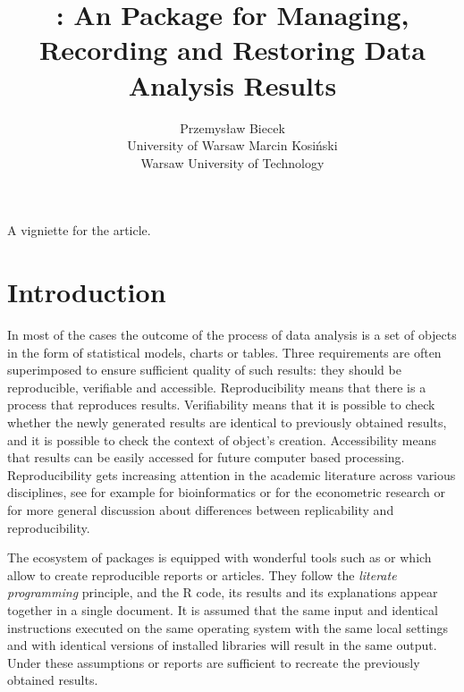 \documentclass[nojss]{jss}\usepackage[]{graphicx}\usepackage[]{color}
\author{Przemys\l{}aw Biecek\\University of Warsaw \And 
        Marcin Kosi\'nski\\Warsaw University of Technology}
\title{\pkg{archivist}: An \proglang{R} Package for Managing, Recording and Restoring Data Analysis Results}
\begin{document}
A vigniette for the \cite{archivist} article.


\section{Introduction}

In most of the cases the outcome of the process of data analysis is a set of objects in the form of statistical models, charts or tables. Three requirements are often superimposed to ensure sufficient quality of such results: they should be reproducible, verifiable and accessible. Reproducibility means that there is a process that reproduces results. Verifiability means that it is possible to check whether the newly generated results are identical to previously obtained results{, and it is possible to check the context of object's creation}. Accessibility means that results can be easily accessed for future computer based processing. Reproducibility gets increasing attention in the academic literature across various disciplines, see for example \cite{Peng01072009} for bioinformatics or \cite{Koenker} for the econometric research or \cite{Replicability} for more general discussion about differences between replicability and reproducibility. 

The  ecosystem of packages is equipped with wonderful tools such as  \citep[see][]{knitr2, knitr} or  \citep[see][]{Sweave, Sweave2} which allow to create reproducible reports or articles. They follow the \textit{literate programming} principle, and the R code, its results and its explanations appear together in a single document. {It is assumed that} the same input and identical instructions executed on the same operating system with the same local settings and with identical versions of installed libraries will result in the same output. Under these assumptions  or  reports are sufficient to recreate the previously obtained results. 
\end{document}
